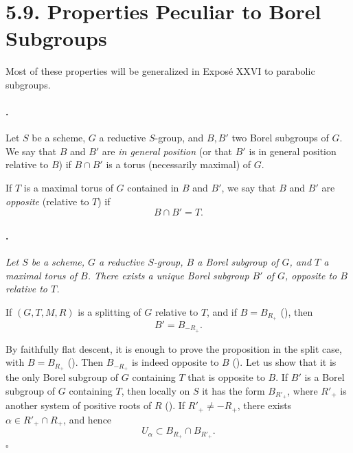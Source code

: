 \section*{5.9. Properties Peculiar to Borel Subgroups}

Most of these properties will be generalized in Exposé XXVI to
parabolic subgroups.

\paragraph{.}
Let \(S\) be a scheme, \(G\) a reductive \(S\)-group, and \(B,B'\)
two Borel subgroups of \(G\). We say that \(B\) and \(B'\) are
\emph{in general position} \textup{(or that \(B'\) is in general
position relative to \(B\))} if \(B\cap B'\) is a torus
\textup{(necessarily maximal)} of \(G\).

If \(T\) is a maximal torus of \(G\) contained in \(B\) and \(B'\),
we say that \(B\) and \(B'\) are \emph{opposite} \textup{(relative
to \(T\))} if
\[
  B\cap B'=T.
\]

\paragraph{.}
{\itshape Let \(S\) be a scheme, \(G\) a reductive \(S\)-group, \(B\)
a Borel subgroup of \(G\), and \(T\) a maximal torus of \(B\). There
exists a unique Borel subgroup \(B'\) of \(G\), opposite to \(B\)
relative to \(T\).

If \((G,T,M,R)\) is a splitting of \(G\) relative to \(T\), and if
\(B=B_{R_+}\) \textup{()}, then
\[
  B'=B_{-R_+}.
\]}

By faithfully flat descent, it is enough to prove the proposition in
the split case, with \(B=B_{R_+}\) \textup{()}. Then
\(B_{-R_+}\) is indeed opposite to \(B\) \textup{()}. Let us
show that it is the only Borel subgroup of \(G\) containing \(T\)
that is opposite to \(B\). If \(B'\) is a Borel subgroup of \(G\)
containing \(T\), then locally on \(S\) it has the form
\(B_{R'_+}\), where \(R'_+\) is another system of positive roots of
\(R\) \textup{()}. If \(R'_+\ne -R_+\), there exists
\(\alpha\in R'_+\cap R_+\), and hence
\[
  U_\alpha\subset B_{R_+}\cap B_{R'_+}.
\]
\hfill\(\square\)

